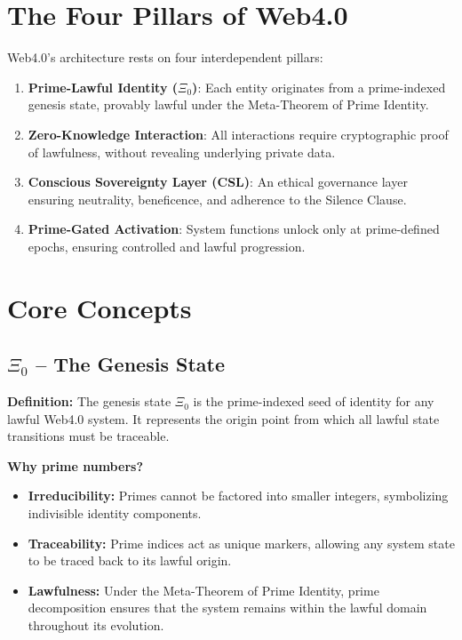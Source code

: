 \documentclass[12]{amsart}
\theoremstyle{plain}
\begin{document}
\section{The Four Pillars of Web4.0}
Web4.0’s architecture rests on four interdependent pillars:
\begin{enumerate}
    \item \textbf{Prime-Lawful Identity ($\Xi_0$)}: Each entity originates from a prime-indexed genesis state, provably lawful under the Meta-Theorem of Prime Identity.
    \item \textbf{Zero-Knowledge Interaction}: All interactions require cryptographic proof of lawfulness, without revealing underlying private data.
    \item \textbf{Conscious Sovereignty Layer (CSL)}: An ethical governance layer ensuring neutrality, beneficence, and adherence to the Silence Clause.
    \item \textbf{Prime-Gated Activation}: System functions unlock only at prime-defined epochs, ensuring controlled and lawful progression.
\end{enumerate}



\section{Core Concepts}

\subsection{$\Xi_0$ -- The Genesis State}
\textbf{Definition:} The genesis state $\Xi_0$ is the prime-indexed seed of identity for any lawful Web4.0 system. It represents the origin point from which all lawful state transitions must be traceable.  

\textbf{Why prime numbers?}
\begin{itemize}
    \item \textbf{Irreducibility:} Primes cannot be factored into smaller integers, symbolizing indivisible identity components.
    \item \textbf{Traceability:} Prime indices act as unique markers, allowing any system state to be traced back to its lawful origin.
    \item \textbf{Lawfulness:} Under the Meta-Theorem of Prime Identity, prime decomposition ensures that the system remains within the lawful domain throughout its evolution.
\end{itemize}
\end{document}
